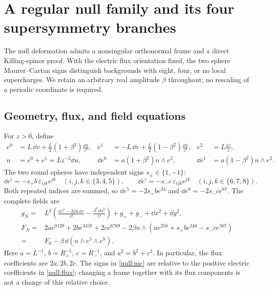 \section{A regular null family and its four supersymmetry branches}\label{sec:null}

The null deformation admits a nonsingular orthonormal frame and a direct Killing-spinor proof. With the electric flux orientation fixed, the two sphere Maurer--Cartan signs distinguish backgrounds with eight, four, or no local supercharges. We retain an arbitrary real amplitude $\beta$ throughout; no rescaling of a periodic coordinate is required.

\subsection{Geometry, flux, and field equations}

For $z>0$, define
\begin{align}
 e^0&=L\,\dd v+\frac L2(1+\beta^2)\frac{\dd u}{z^2},&
 e^1&=-L\,\dd v+\frac L2(1-\beta^2)\frac{\dd u}{z^2},&
 e^2&=L\frac{\dd z}{z},\label{null:frame}\\
 n&=e^0+e^1=Lz^{-2}\dd u,&
 \dd e^0&=a(1+\beta^2)n\wedge e^2,&
 \dd e^1&=a(1-\beta^2)n\wedge e^2.\nonumber
\end{align}
The two round spheres have independent signs $s_\pm\in\{1,-1\}$:
\begin{equation}\label{null:mc}
 \dd e^i=-s_+b\,\varepsilon_{ijk}e^{jk}\quad(i,j,k\in\{3,4,5\}),\qquad
 \dd e^i=-s_-c\,\varepsilon_{ijk}e^{jk}\quad(i,j,k\in\{6,7,8\}).
\end{equation}
Both repeated indices are summed, so $\dd e^5=-2s_+b e^{34}$ and $\dd e^8=-2s_-c e^{67}$. The complete fields are
\begin{align}
 g_N={}&L^2\left(\frac{\dd z^2-2\dd u\,\dd v}{z^2}-\frac{\beta^2\dd u^2}{z^4}\right)
       +g_++g_-+\dd x^2+\dd y^2,\label{null:metric}\\
 F_N={}&2a e^{0129}+2b e^{3459}+2c e^{6789}
 -2\beta n\wedge\left(ae^{258}+s_+b e^{348}-s_-c e^{567}\right)\nonumber\\
 ={}&F_0-\beta\,\dd(n\wedge e^5\wedge e^8).\label{null:flux}
\end{align}
Here $a=L^{-1}$, $b=R_+^{-1}$, $c=R_-^{-1}$, and $a^2=b^2+c^2$. In particular, the flux coefficients are $2a,2b,2c$. The signs in \eqref{null:mc} are relative to the positive electric coefficients in \eqref{null:flux}; changing a frame together with its flux components is not a change of this relative choice.

